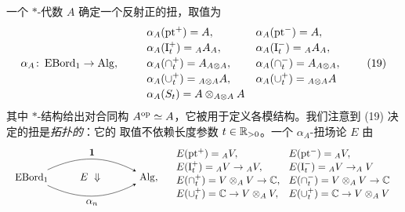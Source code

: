 \begin{example}
一个 $*$-代数 $A$ 确定一个反射正的扭，取值为
\begin{equation}
\alpha_A\colon\operatorname{EBord}_1\to\operatorname{Alg},\qquad
\begin{array}{ll}
\alpha_A(\mathrm{pt}^{+})=A, & \alpha_A(\mathrm{pt}^{-})=A,\\[2pt]
\alpha_A(\mathrm{I}^{+}_t)={}_{A}A_{A}, & \alpha_A(\mathrm{I}^{-}_t)={}_{A}A_{A},\\[2pt]
\alpha_A(\cap^{+}_t)=A_{A\otimes A}, & \alpha_A(\cap^{-}_t)=A_{A\otimes A},\\[2pt]
\alpha_A(\cup^{+}_t)={}_{A\otimes A}A, & \alpha_A(\cup^{+}_t)={}_{A\otimes A}A\\[2pt]
\alpha_A(S_t)=A\otimes_{A\otimes A}A &
\end{array}
\tag{19}
\end{equation}
其中 $*$-结构给出对合同构 $A^{\mathrm{op}}\simeq A$，它被用于定义各模结构。我们注意到 (19) 决定的扭是\emph{拓扑的}：它的
取值不依赖长度参数 $t\in\mathbb{R}_{>0}$。一个 $\alpha_A$-扭场论 $E$ 由
\begin{equation}
\begin{array}{l}
\begin{tikzpicture}[baseline=(current bounding box.center), >=stealth, scale=0.95]
  \node (A) at (0,0) {$\EBord_1$};
  \node (C) at (4.3,0) {$\Alg$,};
  \draw[->] (A) to[bend left=26] node[above] {$\mathbf 1$} (C);
  \draw[->] (A) to[bend right=26] node[below] {$\alpha_n$} (C);
  \node at (2.15,0) {$E\ \Downarrow$};
\end{tikzpicture}
\quad
\begin{array}{l@{\hspace{0.9em}}l}
E(\mathrm{pt}^{+})={}_{A}V, & E(\mathrm{pt}^{-})={}_{\ol{A}}\ol{V},\\[1pt]
E(\mathrm{I}^{+}_t)={}_{A}V\to{}_{A}V, & E(\mathrm{I}^{-}_t)={}_{\ol{A}}\ol{V}\to_{\ol{A}}\ol{V}\\[1pt]
E(\cap^{+}_t)=V\otimes_{\ol{A}}\ol{V}\to\C, & E(\cap^{-}_t)=\ol{V}\otimes_{A}V\to\C\\[1pt]
E(\cup^{+}_t)=\C\to V\otimes_{\ol{A}}\ol{V}, & E(\cup^{+}_t)=\C\to\ol{V}\otimes_{A}V\\[1pt]

\end{array}
\end{array}
\end{equation}
\end{example}
